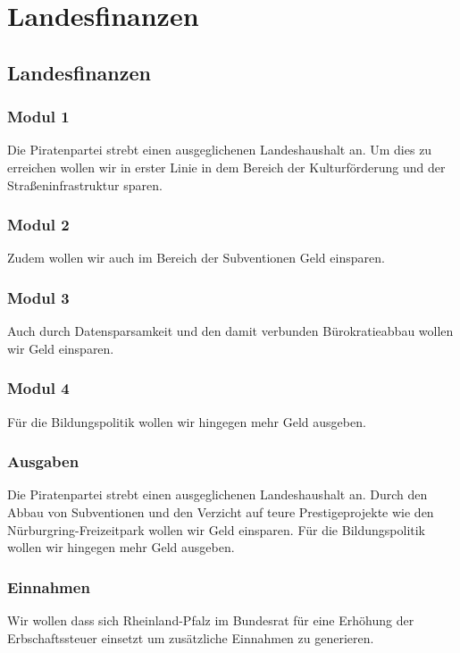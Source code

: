 \section{Landesfinanzen}

\subsection*{Landesfinanzen}
\label{wp:finanzen:land1}
\subsubsection{Modul 1}
\abstimmung
Die Piratenpartei strebt einen ausgeglichenen Landeshaushalt an. Um dies zu erreichen wollen wir in erster Linie in dem Bereich der Kulturförderung und der Straßeninfrastruktur sparen.

\subsubsection{Modul 2}
\abstimmung
Zudem wollen wir auch im Bereich der Subventionen Geld einsparen.

\subsubsection{Modul 3}
\abstimmung
Auch durch Datensparsamkeit und den damit verbunden Bürokratieabbau wollen wir Geld einsparen.

\subsubsection{Modul 4}
Für die Bildungspolitik wollen wir hingegen mehr Geld ausgeben.
 
\label{wp:finanzen:land2}

\subsubsection{Ausgaben}
Die Piratenpartei strebt einen ausgeglichenen Landeshaushalt an. Durch den Abbau von Subventionen und den Verzicht auf teure Prestigeprojekte wie den Nürburgring-Freizeitpark wollen wir Geld einsparen. Für die Bildungspolitik wollen wir hingegen mehr Geld ausgeben.

\subsubsection{Einnahmen}
Wir wollen dass sich Rheinland-Pfalz im Bundesrat für eine Erhöhung der Erbschaftssteuer einsetzt um zusätzliche Einnahmen zu generieren.
 
